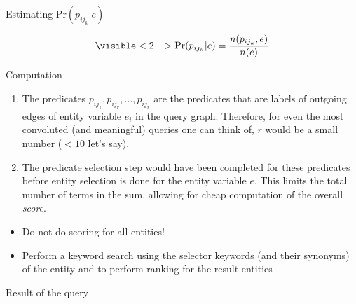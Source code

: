 \documentclass[pdf,11pt]{beamer}
\begin{document}
\begin{frame}{Estimating $\text{Pr}(p_{ij_{k}}| e)$}

\begin{align*}
\visible<2->{\text{Pr}(p_{ij_{k}}| e) = \frac{n(p_{ij_{k}}, e)}{n(e)}}
\end{align*}


\end{frame}

\begin{frame}{Computation}

\begin{enumerate}
  \item<2-> The predicates $p_{ij_1}, p_{ij_r}, ..., p_{ij_r}$ are the predicates that are labels of outgoing edges of entity variable $e_i$ in the query graph. Therefore, for even the most convoluted (and meaningful) queries one can think of, $r$ would be a small number ($< 10$ let's say).
  \item<3-> The predicate selection step would have been completed for these predicates before entity selection is done for the entity variable $e$. This limits the total number of terms in the sum, allowing for cheap computation of the overall \emph{score}.   
\end{enumerate}


\begin{itemize}
\item<4-> Do not do scoring for all entities!
\item<5-> Perform a keyword search using the selector keywords (and their synonyms) of the entity and to perform ranking for the result entities
\end{itemize}

\end{frame}

\begin{frame}{Result of the query}



\vspace{11pt}


\vspace{11pt}


\end{frame}
\end{document}
